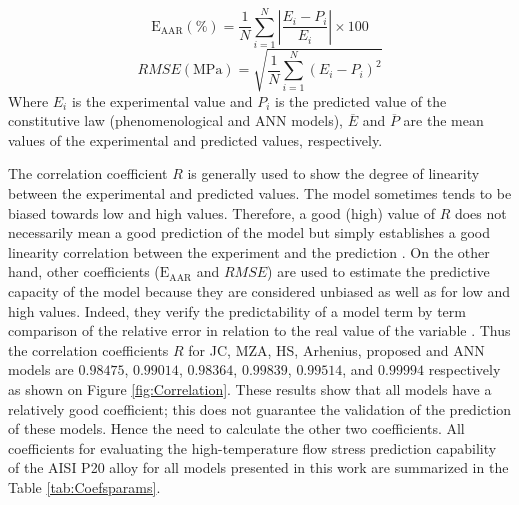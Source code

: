 \documentclass[twoside,english,1p,final,sort&compress]{elsarticle}
\theoremstyle{plain}
\newcommand{\AARE}{\text{E}_\text{AAR}}
\begin{document}
\begin{equation}
\label{eq:AARE-expression}
\AARE(\%) = \frac{1}{N}\displaystyle\sum_{i=1}^{N} \displaystyle\left\lvert\frac{E_i- P_i}{E_i} \right\rvert\times 100
\end{equation}
\begin{equation}
\label{eq:RMSE-expression}
RMSE (\text{MPa}) = \sqrt{\frac{1}{N} \displaystyle\sum_{i=1}^{N} \left(E_i - P_i\right)^2}
\end{equation}
Where $E_i$ is the experimental value and $P_i$ is the predicted value of the constitutive law (phenomenological and ANN models), $\overline{E}$ and $\overline{P}$ are the mean values of the experimental and predicted values, respectively.

The correlation coefficient $R$ is generally used to show the degree of linearity between the experimental and predicted values. The model sometimes tends to be biased towards low and high values. Therefore, a good (high) value of $R$ does not necessarily mean a good prediction of the model but simply establishes a good linearity correlation between the experiment and the prediction \cite{phaniraj2003applicability}. On the other hand, other coefficients ($\AARE$ and $RMSE$) are used to estimate the predictive capacity of the model because they are considered unbiased as well as for low and high values. Indeed, they verify the predictability of a model term by term comparison of the relative error in relation to the real value of the variable \cite{srinivasulu2006comparative}. Thus the correlation coefficients $R$ for JC, MZA, HS, Arhenius, proposed and ANN models are $0.98475$,  $0.99014$,  $0.98364$, $0.99839$, $0.99514$, and $0.99994$ respectively as shown on Figure \ref{fig:Correlation}. These results show that all models have a relatively good coefficient; this does not guarantee the validation of the prediction of these models. Hence the need to calculate the other two coefficients. All coefficients for evaluating the high-temperature flow stress prediction capability of the AISI P20 alloy for all models presented in this work are summarized in the Table \ref{tab:Coefsparams}.
\end{document}
